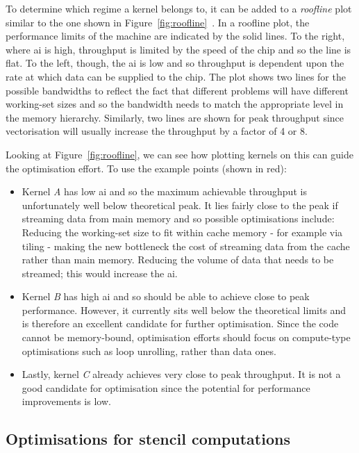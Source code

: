 To determine which regime a kernel belongs to, it can be added to a \textit{roofline} plot similar to the one shown in Figure~\ref{fig:roofline}~\cite{williamsRooflineInsightfulVisual2009}.
In a roofline plot, the performance limits of the machine are indicated by the solid lines.
To the right, where \gls{ai} is high, throughput is limited by the speed of the chip and so the line is flat.
To the left, though, the \gls{ai} is low and so throughput is dependent upon the rate at which data can be supplied to the chip.
The plot shows two lines for the possible bandwidths to reflect the fact that different problems will have different working-set sizes and so the bandwidth needs to match the appropriate level in the memory hierarchy.
Similarly, two lines are shown for peak throughput since vectorisation will usually increase the throughput by a factor of 4 or 8.

Looking at Figure~\ref{fig:roofline}, we can see how plotting kernels on this can guide the optimisation effort.
To use the example points (shown in red):

\begin{itemize}
  \item
    Kernel \textit{A} has low \gls{ai} and so the maximum achievable throughput is unfortunately well below theoretical peak.
    It lies fairly close to the peak if streaming data from main memory and so possible optimisations include:
    Reducing the working-set size to fit within cache memory - for example via tiling - making the new bottleneck the cost of streaming data from the cache rather than main memory.
    Reducing the volume of data that needs to be streamed; this would increase the \gls{ai}.

  \item
    Kernel \textit{B} has high \gls{ai} and so should be able to achieve close to peak performance.
    However, it currently sits well below the theoretical limits and is therefore an excellent candidate for further optimisation.
    Since the code cannot be memory-bound, optimisation efforts should focus on compute-type optimisations such as loop unrolling, rather than data ones.

  \item
    Lastly, kernel \textit{C} already achieves very close to peak throughput.
    It is not a good candidate for optimisation since the potential for performance improvements is low.
\end{itemize}

\subsection{Optimisations for stencil computations}
\label{sec:background_opt}

